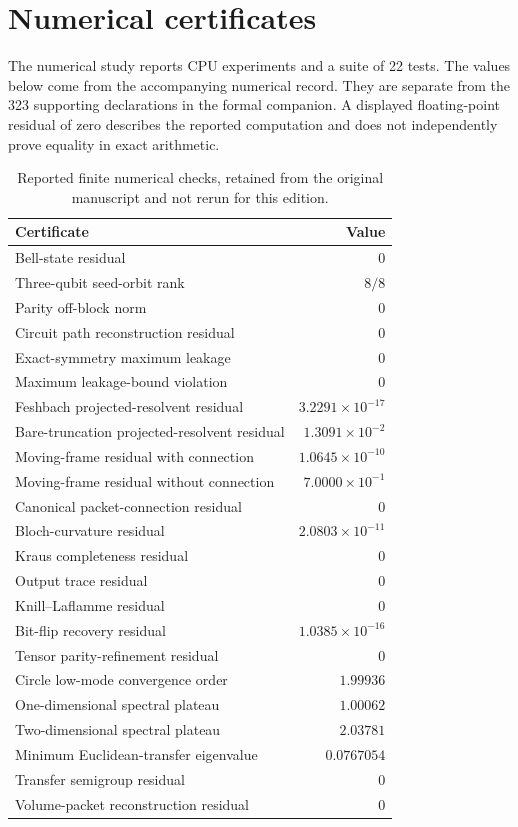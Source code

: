 \section{Numerical certificates}\label{core:section:013}

The numerical study reports CPU experiments and a suite of 22 tests. The values below come from the accompanying numerical record. They are separate from the 323 supporting declarations in the formal companion. A displayed floating-point residual of zero describes the reported computation and does not independently prove equality in exact arithmetic.

\begin{table}[htbp]
\centering
\caption{Reported finite numerical checks, retained from the original manuscript and not rerun for this edition.}
\label{core:tab:certificates}
\begin{tabular}{L{0.64\textwidth}r}
\toprule
Certificate & Value\\
\midrule
Bell-state residual & $0$\\
Three-qubit seed-orbit rank & $8/8$\\
Parity off-block norm & $0$\\
Circuit path reconstruction residual & $0$\\
Exact-symmetry maximum leakage & $0$\\
Maximum leakage-bound violation & $0$\\
Feshbach projected-resolvent residual & $3.2291\times10^{-17}$\\
Bare-truncation projected-resolvent residual & $1.3091\times10^{-2}$\\
Moving-frame residual with connection & $1.0645\times10^{-10}$\\
Moving-frame residual without connection & $7.0000\times10^{-1}$\\
Canonical packet-connection residual & $0$\\
Bloch-curvature residual & $2.0803\times10^{-11}$\\
Kraus completeness residual & $0$\\
Output trace residual & $0$\\
Knill--Laflamme residual & $0$\\
Bit-flip recovery residual & $1.0385\times10^{-16}$\\
Tensor parity-refinement residual & $0$\\
Circle low-mode convergence order & $1.99936$\\
One-dimensional spectral plateau & $1.00062$\\
Two-dimensional spectral plateau & $2.03781$\\
Minimum Euclidean-transfer eigenvalue & $0.0767054$\\
Transfer semigroup residual & $0$\\
Volume-packet reconstruction residual & $0$\\
\bottomrule
\end{tabular}
\end{table}

